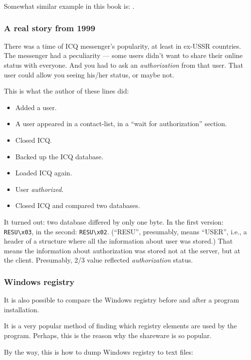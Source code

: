 Somewhat similar example in this book is: .


\subsubsection{A real story from 1999}

There was a time of ICQ messenger's popularity, at least in ex-USSR countries.
The messenger had a peculiarity --- some users didn't want to share their online status with everyone.
And you had to ask an \emph{authorization} from that user.
That user could allow you seeing his/her status, or maybe not.

This is what the author of these lines did:

\begin{itemize}
\item Added a user.
\item A user appeared in a contact-list, in a ``wait for authorization'' section.
\item Closed ICQ.
\item Backed up the ICQ database.
\item Loaded ICQ again.
\item User \emph{authorized}.
\item Closed ICQ and compared two databases.
\end{itemize}

It turned out: two database differed by only one byte.
In the first version: \verb|RESU\x03|, in the second: \verb|RESU\x02|.
(``RESU'', presumably, means ``USER'', i.e., a header of a structure where all the information about user was stored.)
That means the information about authorization was stored not at the server, but at the client.
Presumably, 2/3 value reflected \emph{authorization} status.

\subsubsection{Windows registry}

It is also possible to compare the Windows registry before and after a program installation.

It is a very popular method of finding which registry elements are used by the program.
Perhaps, this is the reason why the  shareware is so popular.

By the way, this is how to dump Windows registry to text files:

